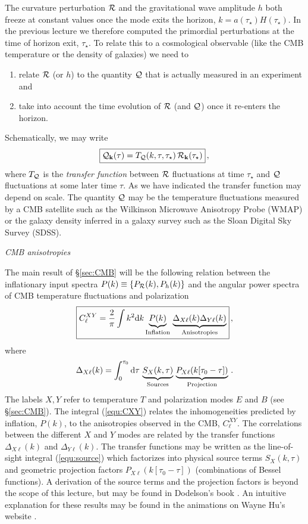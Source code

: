 \documentclass[12pt,letterpaper,rotate]{article}
\def\beq{\begin{equation}}
\def\eeq{\end{equation}}
\def\d{{\rm d}}
\def\R{{\cal R}}
\begin{document}
{The curvature perturbation $\R$ and the gravitational wave amplitude $h$ both freeze at constant values once the mode exits the horizon, $k=a(\tau_\star) H(\tau_\star)$.
In the previous lecture we therefore computed the primordial perturbations at the time of horizon exit, $\tau_\star$.
To relate this to a cosmological observable (like the CMB temperature or the density of galaxies) we need to 
\begin{enumerate}
\item[i)] relate $\R$ (or $h$) to the quantity ${\cal Q}$ that is actually measured in an experiment and 
\item[ii)] take into account the time evolution of $\R$ (and ${\cal Q}$) once it re-enters the horizon.
\end{enumerate}
Schematically, we may write
\beq
\fbox{$\displaystyle
{\cal Q}_{\bf k}(\tau) = T_{\cal Q}(k, \tau,\tau_\star) \, \R_{\bf k}(\tau_\star) $}\, ,
\eeq
where $T_{\cal Q}$ is the {\it transfer function} between $\R$ fluctuations at time $\tau_\star$ and ${\cal Q}$ fluctuations at some later time $\tau$. 
As we have indicated the transfer function may depend on scale.
The quantity ${\cal Q}$ may be the temperature fluctuations measured by a CMB satellite such as the Wilkinson Microwave Anisotropy Probe (WMAP) or the galaxy density inferred in a galaxy survey such as the Sloan Digital Sky Survey (SDSS).


\vskip 6pt
\noindent
{\it CMB anisotropies}

The main result of \S\ref{sec:CMB} will be the following relation between the inflationary input spectra $P(k) \equiv \{ P_\R(k), P_h(k) \}$ and the angular power spectra of CMB temperature fluctuations and polarization
\beq
\label{equ:CXY}
\fbox{$\displaystyle
C_\ell^{XY} = \frac{2}{\pi} \int k^2 \d k \underbrace{P(k)}_{\rm Inflation}\,  \underbrace{\Delta_{X \ell}(k) \Delta_{Y \ell}(k)}_{\rm Anisotropies} $}\, ,
\eeq
where
\beq
\label{equ:source}
\Delta_{X \ell}(k) = \int_0^{\tau_0} \d \tau\, \underbrace{S_X(k, \tau)}_{\rm Sources}\, \underbrace{P_{X\ell}(k[\tau_0-\tau])}_{\rm Projection}\, .
\eeq
The labels $X,Y$ refer to temperature $T$ and polarization modes $E$ and $B$ (see \S\ref{sec:CMB}).
The integral (\ref{equ:CXY}) relates the inhomogeneities predicted by inflation, $P(k)$, to the anisotropies observed in the CMB, $C_\ell^{XY}$. The correlations between the different $X$ and $Y$ modes are related by the transfer functions $\Delta_{X\ell}(k)$ and $\Delta_{Y\ell}(k)$.
The transfer functions may be written as the line-of-sight integral (\ref{equ:source}) which factorizes into physical source terms $S_X(k, \tau)$ and geometric projection factors $P_{X\ell}(k[\tau_0-\tau])$ (combinations of Bessel functions).
A derivation of the source terms and the projection factors is beyond the scope of this lecture, but may be found in Dodelson's book \cite{Dodelson}. An intuitive explanation for these results may be found in the animations on Wayne Hu's website \cite{WayneHu}.

}
\end{document}
